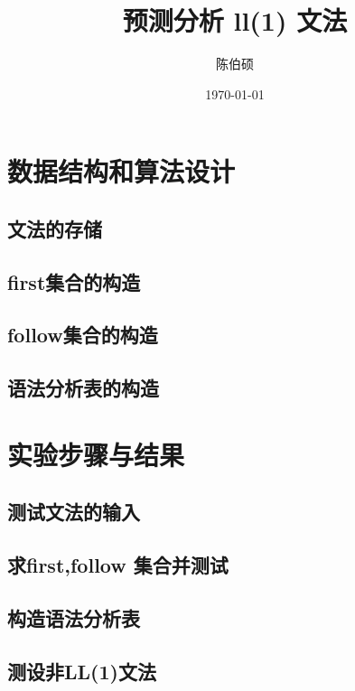 \documentclass[pdfCover]{myreport} %
\title{预测分析 ll(1) 文法}
\author{陈伯硕}
\date{\today}
\begin{document}
\maketitle
\pagestyle{empty}

\setcounter{section}{3}
\section{数据结构和算法设计}
  \subsection{文法的存储}
    
  \subsection{first集合的构造}
    
  \subsection{follow集合的构造}
    
  \subsection{语法分析表的构造}
    



\section{实验步骤与结果}
  \subsection{测试文法的输入}
    
  \subsection{求first,follow 集合并测试}
    
  \subsection{构造语法分析表}
    
  \subsection{测设非LL(1)文法}
  
\end{document}
